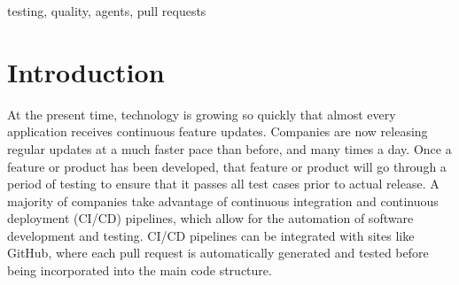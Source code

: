 \documentclass[conference]{IEEEtran}
\begin{document}


\begin{IEEEkeywords}
testing, quality, agents, pull requests
\end{IEEEkeywords}



\section{Introduction}
\label{Section:Introduction}
At the present time, technology is growing so quickly that almost every application receives continuous feature updates. Companies are now releasing regular updates at a much faster pace than before, and many times a day. Once a feature or product has been developed, that feature or product will go through a period of testing to ensure that it passes all test cases prior to actual release. A majority of companies take advantage of continuous integration and continuous deployment (CI/CD) pipelines, which allow for the automation of software development and testing. CI/CD pipelines can be integrated with sites like GitHub, where each pull request is automatically generated and tested before being incorporated into the main code structure.
\end{document}
